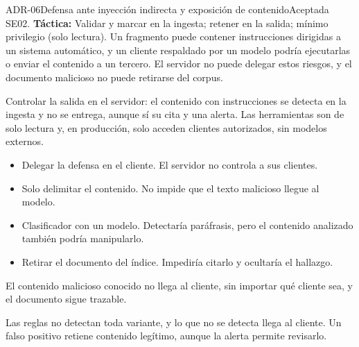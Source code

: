 \begin{adr}{ADR-06}{Defensa ante inyección indirecta y exposición de contenido}{Aceptada}
 SE02. \textbf{Táctica:} Validar y marcar en la ingesta; retener en la salida; mínimo privilegio (solo lectura).
Un fragmento puede contener instrucciones dirigidas a un sistema automático, y un cliente respaldado por un modelo podría ejecutarlas o enviar el contenido a un tercero. El servidor no puede
delegar estos riesgos, y el documento malicioso no puede retirarse del corpus.

Controlar la salida en el servidor: el contenido con instrucciones se detecta en la ingesta y no se entrega, aunque sí su cita y una alerta. Las herramientas son de solo lectura y, en producción, solo acceden clientes
autorizados, sin modelos externos.

\begin{itemize}
  \item Delegar la defensa en el cliente. El servidor no controla a sus clientes.
  \item Solo delimitar el contenido. No impide que el texto malicioso llegue al modelo.
  \item Clasificador con un modelo. Detectaría paráfrasis, pero el contenido analizado también podría manipularlo.
  \item Retirar el documento del índice. Impediría citarlo y ocultaría el hallazgo.
\end{itemize}

El contenido malicioso conocido no llega al cliente, sin importar qué cliente sea, y el documento sigue trazable.

Las reglas no detectan toda variante, y lo que no se detecta llega al cliente. Un falso positivo retiene contenido legítimo, aunque la alerta permite revisarlo.
\end{adr}

